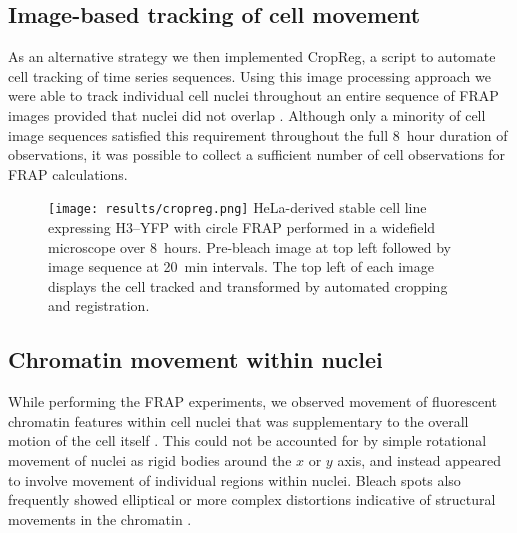     \subsection{Image-based tracking of cell movement}

    As an alternative strategy we then implemented CropReg, a script
    to automate cell tracking of time series sequences.
    Using this image processing approach we were
    able to track individual cell nuclei
    throughout an entire sequence of FRAP images
    provided that nuclei did not overlap .
    Although only a minority of cell image sequences satisfied this requirement
    throughout the full 8~hour duration of observations,
    it was possible to collect a sufficient number of
    cell observations for FRAP calculations.

    \begin{figure}
      \centering
      \texttt{[image: results/cropreg.png]}
        {
         HeLa-derived stable cell line expressing H3--YFP
         with circle FRAP performed in a widefield microscope over 8~hours.
         Pre-bleach image at top left followed by
         image sequence at 20~min intervals.
         The top left of each image displays the cell tracked and transformed
         by automated cropping and registration.
        }
      \label{fig:kill-frap:cropreg}
    \end{figure}

  \subsection{Chromatin movement within nuclei}

    While performing the FRAP experiments, we observed movement
    of fluorescent chromatin features
    within cell nuclei that was supplementary to the overall
    motion of the cell itself .
    This could not be accounted for by simple rotational movement of nuclei
    as rigid bodies around the $x$ or $y$ axis,
    and instead appeared to involve movement of
    individual regions within nuclei.
    Bleach spots also frequently showed elliptical or more complex distortions
    indicative of structural movements in the chromatin
    .

